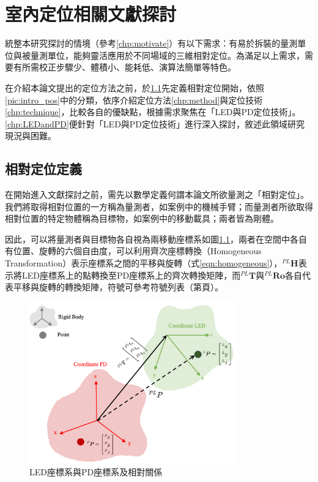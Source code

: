 \chapter{室內定位相關文獻探討}







統整本研究探討的情境（參考\ref{chp:motivate}）有以下需求：有易於拆裝的量測單位與被量測單位，能夠靈活應用於不同場域的三維相對定位。為滿足以上需求，需要有所需校正步驟少、體積小、能耗低、演算法簡單等特色。




在介紹本論文提出的定位方法之前，於\ref{chp:relative}先定義相對定位開始，依照\ref{pic:intro_pos}中的分類，依序介紹定位方法\ref{chp:method}與定位技術\ref{chp:technique}，比較各自的優缺點，根據需求聚焦在「LED與PD定位技術」。\ref{chp:LEDandPD}便針對「LED與PD定位技術」進行深入探討，敘述此領域研究現況與困難。









\section{相對定位定義}
\label{chp:relative}
    
    在開始進入文獻探討之前，需先以數學定義何謂本論文所欲量測之「相對定位」。我們將取得相對位置的一方稱為量測者，如案例中的機械手臂；而量測者所欲取得相對位置的特定物體稱為目標物，如案例中的移動載具；兩者皆為剛體。
    
    因此，可以將量測者與目標物各自視為兩移動座標系如圖\ref{pic:homo_trans}，兩者在空間中各自有位置、旋轉的六個自由度，可以利用齊次座標轉換（Homogeneous Transformation）表示座標系之間的平移與旋轉（式\ref{eqn:homogeneous}），$^{PL}\boldsymbol{H}$表示將LED座標系上的點轉換至PD座標系上的齊次轉換矩陣，而$^{PL}\boldsymbol{T}$與$^{PL}\boldsymbol{Ro}$各自代表平移與旋轉的轉換矩陣，符號可參考符號列表（第\pageref{chp:symbol}頁）。
    
    \begin{figure}[h]
        \centering
        \includegraphics[width=9cm]{ch2pic/homo_trans.png}
        \caption{LED座標系與PD座標系及相對關係}
        \label{pic:homo_trans}
    \end{figure}

